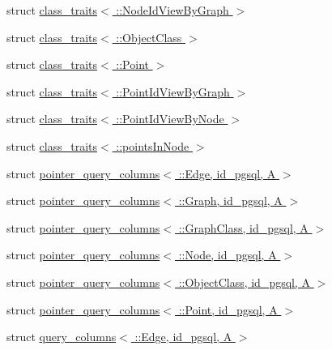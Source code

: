\begin{DoxyCompactItemize}
\item 
struct \hyperlink{structodb_1_1class__traits_3_01_1_1_node_id_view_by_graph_01_4}{class\+\_\+traits$<$ \+::\+Node\+Id\+View\+By\+Graph $>$}
\item 
struct \hyperlink{structodb_1_1class__traits_3_01_1_1_object_class_01_4}{class\+\_\+traits$<$ \+::\+Object\+Class $>$}
\item 
struct \hyperlink{structodb_1_1class__traits_3_01_1_1_point_01_4}{class\+\_\+traits$<$ \+::\+Point $>$}
\item 
struct \hyperlink{structodb_1_1class__traits_3_01_1_1_point_id_view_by_graph_01_4}{class\+\_\+traits$<$ \+::\+Point\+Id\+View\+By\+Graph $>$}
\item 
struct \hyperlink{structodb_1_1class__traits_3_01_1_1_point_id_view_by_node_01_4}{class\+\_\+traits$<$ \+::\+Point\+Id\+View\+By\+Node $>$}
\item 
struct \hyperlink{structodb_1_1class__traits_3_01_1_1points_in_node_01_4}{class\+\_\+traits$<$ \+::points\+In\+Node $>$}
\item 
struct \hyperlink{structodb_1_1pointer__query__columns_3_01_1_1_edge_00_01id__pgsql_00_01_a_01_4}{pointer\+\_\+query\+\_\+columns$<$ \+::\+Edge, id\+\_\+pgsql, A $>$}
\item 
struct \hyperlink{structodb_1_1pointer__query__columns_3_01_1_1_graph_00_01id__pgsql_00_01_a_01_4}{pointer\+\_\+query\+\_\+columns$<$ \+::\+Graph, id\+\_\+pgsql, A $>$}
\item 
struct \hyperlink{structodb_1_1pointer__query__columns_3_01_1_1_graph_class_00_01id__pgsql_00_01_a_01_4}{pointer\+\_\+query\+\_\+columns$<$ \+::\+Graph\+Class, id\+\_\+pgsql, A $>$}
\item 
struct \hyperlink{structodb_1_1pointer__query__columns_3_01_1_1_node_00_01id__pgsql_00_01_a_01_4}{pointer\+\_\+query\+\_\+columns$<$ \+::\+Node, id\+\_\+pgsql, A $>$}
\item 
struct \hyperlink{structodb_1_1pointer__query__columns_3_01_1_1_object_class_00_01id__pgsql_00_01_a_01_4}{pointer\+\_\+query\+\_\+columns$<$ \+::\+Object\+Class, id\+\_\+pgsql, A $>$}
\item 
struct \hyperlink{structodb_1_1pointer__query__columns_3_01_1_1_point_00_01id__pgsql_00_01_a_01_4}{pointer\+\_\+query\+\_\+columns$<$ \+::\+Point, id\+\_\+pgsql, A $>$}
\item 
struct \hyperlink{structodb_1_1query__columns_3_01_1_1_edge_00_01id__pgsql_00_01_a_01_4}{query\+\_\+columns$<$ \+::\+Edge, id\+\_\+pgsql, A $>$}
\item 

\end{DoxyCompactItemize}
